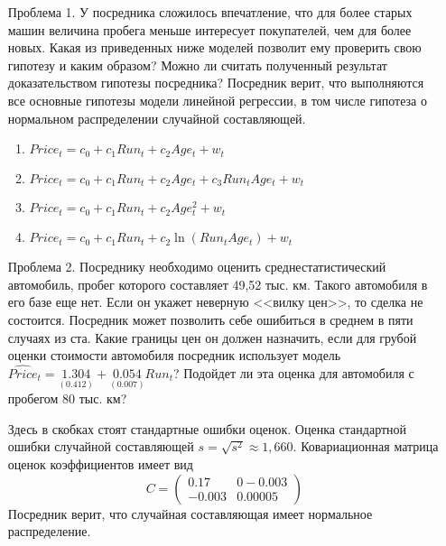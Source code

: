\documentclass[pdftex,12pt,a4paper]{article}
\begin{document}
\begin{enumerate}
\begin{enumerate}
\item[Проблема 1.] У посредника сложилось впечатление, что для более старых машин величина
пробега меньше интересует покупателей, чем для более новых. Какая из приведенных
ниже моделей позволит ему проверить свою гипотезу и каким образом? Можно ли считать
полученный результат доказательством гипотезы посредника? Посредник верит, что
выполняются все основные гипотезы модели линейной регрессии, в том числе гипотеза о
нормальном распределении случайной составляющей.
\begin{enumerate}
\item $Price_t=c_0+c_1 Run_t+c_2 Age_t+w_t$
\item $Price_t=c_0+c_1 Run_t+c_2 Age_t+c_3 Run_t Age_t+w_t$
\item $Price_t=c_0+c_1 Run_t+c_2 Age_t^2+w_t$
\item $Price_t=c_0+c_1 Run_t+c_2 \ln(Run_t Age_t)+w_t$
\end{enumerate}

\item[Проблема 2.] Посреднику необходимо оценить среднестатистический автомобиль, пробег
которого составляет 49,52 тыс. км. Такого автомобиля в его базе еще нет. Если он укажет
неверную <<вилку цен>>, то сделка не состоится. Посредник может позволить себе
ошибиться в среднем в пяти случаях из ста. Какие границы цен он должен назначить, если
для грубой оценки стоимости автомобиля посредник использует модель
$\widehat{Price}_t=\underset{(0.412)}{1.304}+\underset{(0.007)}{0.054}Run_t$? Подойдет ли эта оценка для автомобиля с пробегом 80 тыс. км?


Здесь в скобках стоят стандартные ошибки оценок. Оценка стандартной ошибки
случайной составляющей $s=\sqrt{s^2}\approx 1,660$. Ковариационная матрица оценок
коэффициентов имеет вид 
\[
C=\left(
\begin{array}{cc}
0.17 & 0 -0.003 \\
-0.003 & 0.00005
\end{array}
\right)
\]
Посредник верит, что случайная составляющая имеет нормальное распределение.
\end{enumerate}

\end{enumerate}
\end{document}
